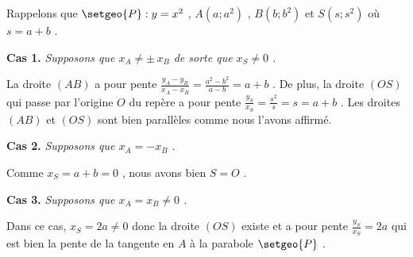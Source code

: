 Rappelons que $\setgeo{P} : y = x^2$ , $A(a ; a^2)$ , $B(b ; b^2)$ et $S(s ; s^2)$ où $s = a + b$ .



\bigskip

\textbf{Cas 1.} \emph{Supposons que $x_A \neq \pm \, x_B$ de sorte que $x_S \neq 0$ .}

\medskip

La droite $(AB)$ a pour pente
$\frac{y_A - y_B}{x_A - x_B} = \frac{a^2 - b^2}{a - b} = a + b$ .
De plus, la droite $(OS)$ qui passe par l'origine $O$ du repère a pour pente
$\frac{y_S}{x_S} = \frac{s^2}{s} = s = a + b$ .
Les droites $(AB)$ et $(OS)$ sont bien parallèles comme nous l'avons affirmé.


\bigskip

\textbf{Cas 2.} \emph{Supposons que $x_A = - x_B$ .}

\medskip

Comme $x_S = a + b = 0$ , nous avons bien $S = O$ .


\bigskip

\textbf{Cas 3.} \emph{Supposons que $x_A = x_B \neq 0$ .}

\medskip

Dans ce cas, $x_S = 2a \neq 0$ donc la droite $(OS)$ existe et a pour pente
$\frac{y_S}{x_S} = 2a$ qui est bien la pente de la tangente en $A$ à la parabole $\setgeo{P}$ .